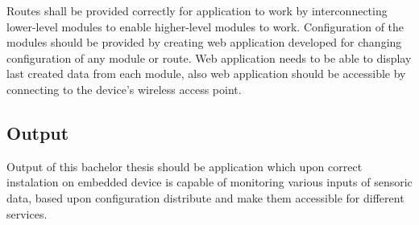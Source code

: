 Routes shall be provided correctly for application to work by interconnecting lower-level modules to enable higher-level modules to work. Configuration of the modules should be provided by creating web application developed for changing configuration of any module or route. Web application needs to be able to display last created data from each module, also web application should be accessible by connecting to the device's wireless access point.
\subsection{Output}
Output of this bachelor thesis should be application which upon correct instalation on embedded device is capable of monitoring various inputs of sensoric data, based upon configuration distribute and make them accessible for different services.



